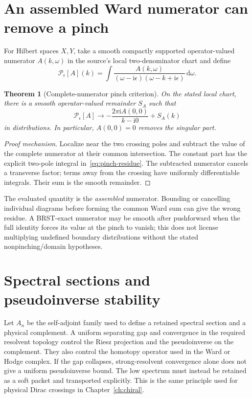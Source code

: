 \documentclass[11pt,a4paper,oneside]{book}
\theoremstyle{plain}
\newtheorem{theorem}{Theorem}[chapter]
\theoremstyle{definition}
\theoremstyle{remark}
\newcommand{\dd}{\mathrm d}
\newcommand{\ii}{\mathrm i}
\newcommand{\src}[2]{\cite{#1}}
\begin{document}
\section{An assembled Ward numerator can remove a pinch}
For Hilbert spaces $X,Y$, take a smooth compactly supported operator-valued numerator $A(k,\omega)$ in the source's local two-denominator chart and define
\begin{equation}
 \mathcal P_\epsilon[A](k)
 =\int\frac{A(k,\omega)}{(\omega-\ii\epsilon)
                             (\omega-k+\ii\epsilon)}\,\dd\omega.
 \label{eq:pinch}
\end{equation}

\begin{theorem}[Complete-numerator pinch criterion]
\label{thm:pinch}
On the stated local chart, there is a smooth operator-valued remainder $S_A$ such that
\begin{equation}
 \mathcal P_\epsilon[A]\longrightarrow
 -\frac{2\pi\ii A(0,0)}{k-\ii0}+S_A(k)
 \label{eq:pinch-residue}
\end{equation}
in distributions. In particular, $A(0,0)=0$ removes the singular part.
\end{theorem}
\begin{proof}[Proof mechanism]
Localize near the two crossing poles and subtract the value of the complete numerator at their common intersection. The constant part has the explicit two-pole integral in~\eqref{eq:pinch-residue}. The subtracted numerator cancels a transverse factor; terms away from the crossing have uniformly differentiable integrals. Their sum is the smooth remainder.
\end{proof}
\src{R2}{thm:v2v85-residue}
The evaluated quantity is the \emph{assembled} numerator. Bounding or cancelling individual diagrams before forming the common Ward sum can give the wrong residue. A BRST-exact numerator may be smooth after pushforward when the full identity forces its value at the pinch to vanish; this does not license multiplying undefined boundary distributions without the stated nonpinching/domain hypotheses.

\section{Spectral sections and pseudoinverse stability}
Let $A_n$ be the self-adjoint family used to define a retained spectral section and a physical complement. A uniform separating gap and convergence in the required resolvent topology control the Riesz projection and the pseudoinverse on the complement. They also control the homotopy operator used in the Ward or Hodge complex. If the gap collapses, strong-resolvent convergence alone does not give a uniform pseudoinverse bound. The low spectrum must instead be retained as a soft packet and transported explicitly. This is the same principle used for physical Dirac crossings in Chapter~\ref{ch:chiral}. \cite{R2,R3,R12}
\end{document}

